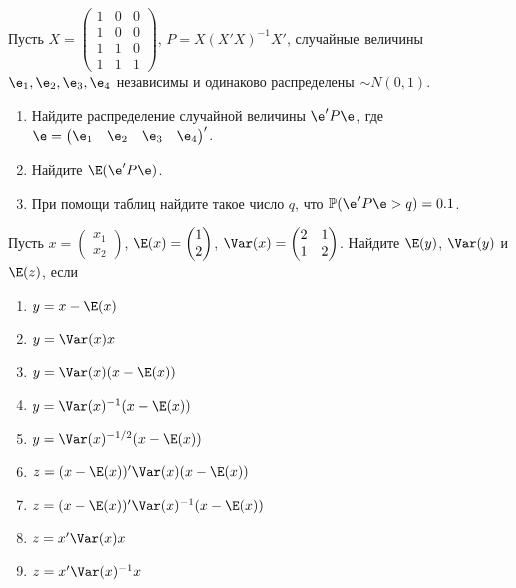 \documentclass[pdftex,11pt,openany]{book}\usepackage[]{graphicx}\usepackage[]{color}
\begin{document}
\begin{solution}
\end{solution}


\begin{problem}

Пусть $X = \begin{pmatrix} 1 & 0 & 0 \\ 1 & 0 & 0 \\ 1 & 1 & 0  \\ 1 & 1 & 1 \end{pmatrix} $, $P = X(X'X)^{-1}X'$, случайные величины $\e_1, \e_2, \e_3, \e_4$ независимы и одинаково распределены $\sim N (0,1)$.
\begin{enumerate}
\item Найдите распределение случайной величины $\e'P\e$, где $\e = \begin{pmatrix} \e_1 & \e_2 & \e_3 & \e_4 \end{pmatrix}'$.
\item Найдите $\E(\e'P\e)$.
\item При помощи таблиц найдите такое число $q$, что $\mathbb{P}(\e'P\e > q)=0.1$. 
\end{enumerate}
\end{problem}

\begin{solution}
\end{solution}



\begin{problem}
Пусть  $x = \begin{pmatrix} x_1 \\ x_2 \end{pmatrix}$, $\E(x) = \begin{pmatrix} 1 \\ 2 \end{pmatrix}$, $\Var(x) = \begin{pmatrix} 2 & 1 \\ 1 & 2 \end{pmatrix}$. Найдите $\E(y)$, $\Var(y)$ и $\E(z)$, если
\begin{enumerate}
\item $y = x - \E(x)$
\item $y = \Var(x)x$
\item $y = \Var(x)(x - \E(x))$
\item $y = \Var(x)^{-1}(x - \E(x))$
\item $y = \Var(x)^{-1/2}(x - \E(x))$
\item $z = (x - \E(x))'\Var(x)(x - \E(x))$
\item $z = (x - \E(x))'\Var(x)^{-1}(x - \E(x))$
\item $z = x'\Var(x)x$
\item $z = x'\Var(x)^{-1}x$
\end{enumerate}

\end{problem}
\end{document}
